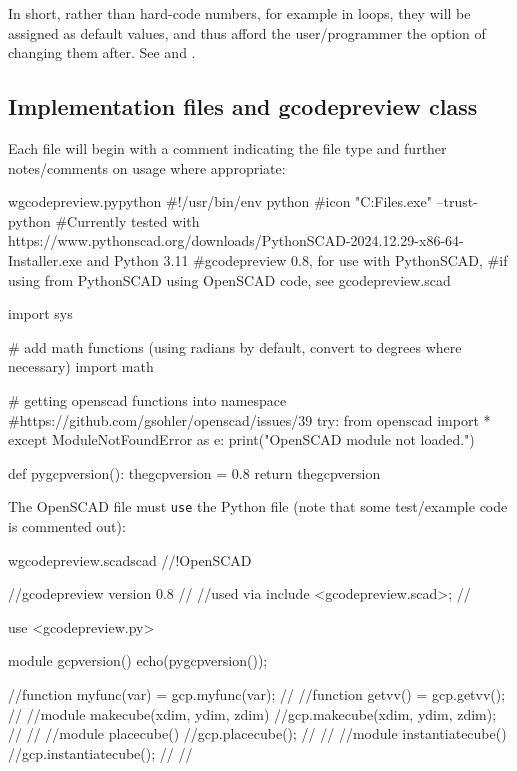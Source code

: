 \documentclass{ltxdoc}
\begin{document}
In short, rather than hard-code numbers, for example in loops, they will be assigned as default values, and thus afford the user/programmer the option of changing them after. See  and .

\subsection{Implementation files and gcodepreview class}
 
Each file will begin with a comment indicating the file type and further notes/comments on usage where appropriate:

\begin{writecode}{w}{gcodepreview.py}{python}
#!/usr/bin/env python
#icon "C:\Program Files\PythonSCAD\bin\openscad.exe" --trust-python
#Currently tested with https://www.pythonscad.org/downloads/PythonSCAD-2024.12.29-x86-64-Installer.exe and Python 3.11
#gcodepreview 0.8, for use with PythonSCAD, 
#if using from PythonSCAD using OpenSCAD code, see gcodepreview.scad

import sys

# add math functions (using radians by default, convert to degrees where necessary)
import math

# getting openscad functions into namespace
#https://github.com/gsohler/openscad/issues/39
try:
    from openscad import *
except ModuleNotFoundError as e:
    print("OpenSCAD module not loaded.")
    
def pygcpversion():
    thegcpversion = 0.8
    return thegcpversion
 
\end{writecode}
\addtocounter{gcpy}{23}

The OpenSCAD file must \verb|use| the Python file (note that some test/example code is commented out):

\begin{writecode}{w}{gcodepreview.scad}{scad}
//!OpenSCAD
 
//gcodepreview version 0.8
//
//used via include <gcodepreview.scad>;
//

use <gcodepreview.py>

module gcpversion(){
echo(pygcpversion());
}

//function myfunc(var) = gcp.myfunc(var);
//
//function getvv() = gcp.getvv();
//
//module makecube(xdim, ydim, zdim){
//gcp.makecube(xdim, ydim, zdim);
//}
//
//module placecube(){
//gcp.placecube();
//}
//
//module instantiatecube(){
//gcp.instantiatecube();
//}
//
\end{writecode}
\addtocounter{gcpscad}{30}
\end{document}
